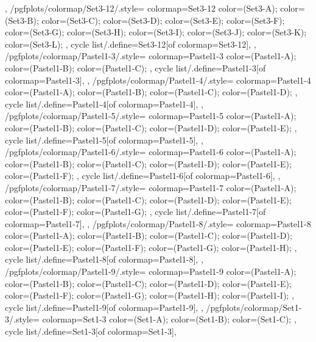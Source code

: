 {{  },
  /pgfplots/colormap/Set3-12/.style={
    colormap={Set3-12}{
      color=(Set3-A);
      color=(Set3-B);
      color=(Set3-C);
      color=(Set3-D);
      color=(Set3-E);
      color=(Set3-F);
      color=(Set3-G);
      color=(Set3-H);
      color=(Set3-I);
      color=(Set3-J);
      color=(Set3-K);
      color=(Set3-L);
    },
    cycle list/.define={Set3-12}{[of colormap=Set3-12]},
  },
  /pgfplots/colormap/Pastel1-3/.style={
    colormap={Pastel1-3}{
      color=(Pastel1-A);
      color=(Pastel1-B);
      color=(Pastel1-C);
    },
    cycle list/.define={Pastel1-3}{[of colormap=Pastel1-3]},
  },
  /pgfplots/colormap/Pastel1-4/.style={
    colormap={Pastel1-4}{
      color=(Pastel1-A);
      color=(Pastel1-B);
      color=(Pastel1-C);
      color=(Pastel1-D);
    },
    cycle list/.define={Pastel1-4}{[of colormap=Pastel1-4]},
  },
  /pgfplots/colormap/Pastel1-5/.style={
    colormap={Pastel1-5}{
      color=(Pastel1-A);
      color=(Pastel1-B);
      color=(Pastel1-C);
      color=(Pastel1-D);
      color=(Pastel1-E);
    },
    cycle list/.define={Pastel1-5}{[of colormap=Pastel1-5]},
  },
  /pgfplots/colormap/Pastel1-6/.style={
    colormap={Pastel1-6}{
      color=(Pastel1-A);
      color=(Pastel1-B);
      color=(Pastel1-C);
      color=(Pastel1-D);
      color=(Pastel1-E);
      color=(Pastel1-F);
    },
    cycle list/.define={Pastel1-6}{[of colormap=Pastel1-6]},
  },
  /pgfplots/colormap/Pastel1-7/.style={
    colormap={Pastel1-7}{
      color=(Pastel1-A);
      color=(Pastel1-B);
      color=(Pastel1-C);
      color=(Pastel1-D);
      color=(Pastel1-E);
      color=(Pastel1-F);
      color=(Pastel1-G);
    },
    cycle list/.define={Pastel1-7}{[of colormap=Pastel1-7]},
  },
  /pgfplots/colormap/Pastel1-8/.style={
    colormap={Pastel1-8}{
      color=(Pastel1-A);
      color=(Pastel1-B);
      color=(Pastel1-C);
      color=(Pastel1-D);
      color=(Pastel1-E);
      color=(Pastel1-F);
      color=(Pastel1-G);
      color=(Pastel1-H);
    },
    cycle list/.define={Pastel1-8}{[of colormap=Pastel1-8]},
  },
  /pgfplots/colormap/Pastel1-9/.style={
    colormap={Pastel1-9}{
      color=(Pastel1-A);
      color=(Pastel1-B);
      color=(Pastel1-C);
      color=(Pastel1-D);
      color=(Pastel1-E);
      color=(Pastel1-F);
      color=(Pastel1-G);
      color=(Pastel1-H);
      color=(Pastel1-I);
    },
    cycle list/.define={Pastel1-9}{[of colormap=Pastel1-9]},
  },
  /pgfplots/colormap/Set1-3/.style={
    colormap={Set1-3}{
      color=(Set1-A);
      color=(Set1-B);
      color=(Set1-C);
    },
    cycle list/.define={Set1-3}{[of colormap=Set1-3]},
}}

